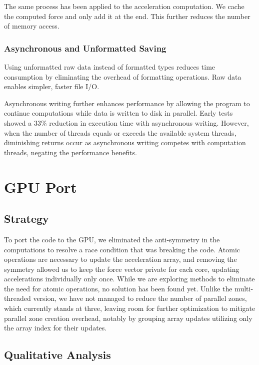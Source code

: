 \documentclass[english,11pt]{article}
\begin{document}
The same process has been applied to the acceleration computation. We cache the computed force and only add it at the end. This further reduces the number of memory access.



\subsubsection{Asynchronous and Unformatted Saving}
Using unformatted raw data instead of formatted types reduces time consumption by eliminating the overhead of formatting operations. Raw data enables simpler, faster file I/O. 

Asynchronous writing further enhances performance by allowing the program to continue computations while data is written to disk in parallel. Early tests showed a 33\% reduction in execution time with asynchronous writing. However, when the number of threads equals or exceeds the available system threads, diminishing returns occur as asynchronous writing competes with computation threads, negating the performance benefits.




\section{GPU Port}

\subsection{Strategy}

To port the code to the GPU, we eliminated the anti-symmetry in the computations to resolve a race condition that was breaking the code. Atomic operations are necessary to update the acceleration array, and removing the symmetry allowed us to keep the force vector private for each core, updating accelerations individually only once. While we are exploring methods to eliminate the need for atomic operations, no solution has been found yet. Unlike the multi-threaded version, we have not managed to reduce the number of parallel zones, which currently stands at three, leaving room for further optimization to mitigate parallel zone creation overhead, notably by grouping array updates utilizing only the array index for their updates.


\subsection{Qualitative Analysis}
\end{document}
